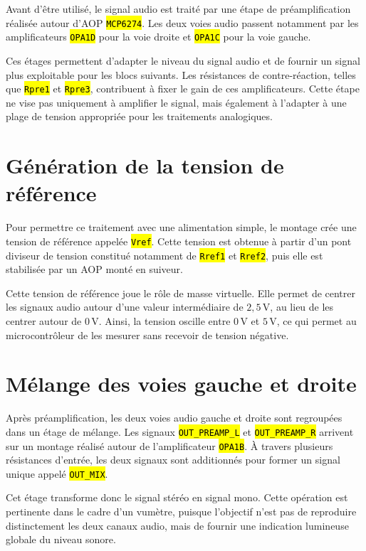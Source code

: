 \documentclass{report}
\let\OldTexttt\texttt
\renewcommand{\texttt}[1]{\OldTexttt{\hl{#1}}}
\begin{document}
Avant d'être utilisé, le signal audio est traité par une étape de préamplification réalisée autour d'AOP \texttt{MCP6274}. Les deux voies audio passent notamment par les amplificateurs \texttt{OPA1D} pour la voie droite et \texttt{OPA1C} pour la voie gauche.

Ces étages permettent d'adapter le niveau du signal audio et de fournir un signal plus exploitable pour les blocs suivants. Les résistances de contre-réaction, telles que \texttt{Rpre1} et \texttt{Rpre3}, contribuent à fixer le gain de ces amplificateurs. Cette étape ne vise pas uniquement à amplifier le signal, mais également à l'adapter à une plage de tension appropriée pour les traitements analogiques.

\section{Génération de la tension de référence}

Pour permettre ce traitement avec une alimentation simple, le montage crée une tension de référence appelée \texttt{Vref}. Cette tension est obtenue à partir d'un pont diviseur de tension constitué notamment de \texttt{Rref1} et \texttt{Rref2}, puis elle est stabilisée par un AOP monté en suiveur.

Cette tension de référence joue le rôle de masse virtuelle. Elle permet de centrer les signaux audio autour d'une valeur intermédiaire de \(2{,}5\,\mathrm{V}\), au lieu de les centrer autour de \(0\,\mathrm{V}\). Ainsi, la tension oscille entre \(0\,\mathrm{V}\) et \(5\,\mathrm{V}\), ce qui permet au microcontrôleur de les mesurer sans recevoir de tension négative.
\newpage
\section{Mélange des voies gauche et droite}

Après préamplification, les deux voies audio gauche et droite sont regroupées dans un étage de mélange. Les signaux \texttt{OUT\_PREAMP\_L} et \texttt{OUT\_PREAMP\_R} arrivent sur un montage réalisé autour de l'amplificateur \texttt{OPA1B}. À travers plusieurs résistances d'entrée, les deux signaux sont additionnés pour former un signal unique appelé \texttt{OUT\_MIX}.

Cet étage transforme donc le signal stéréo en signal mono. Cette opération est pertinente dans le cadre d'un vumètre, puisque l'objectif n'est pas de reproduire distinctement les deux canaux audio, mais de fournir une indication lumineuse globale du niveau sonore.
\end{document}
